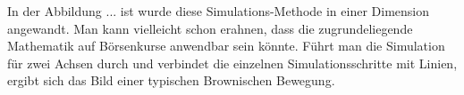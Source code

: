 In der Abbildung ... ist wurde diese Simulations-Methode in einer Dimension angewandt. Man kann vielleicht schon erahnen, dass die zugrundeliegende Mathematik auf Börsenkurse anwendbar sein könnte. Führt man die Simulation für zwei Achsen durch und verbindet die einzelnen Simulationsschritte mit Linien, ergibt sich das Bild einer typischen Brownischen Bewegung.

%
